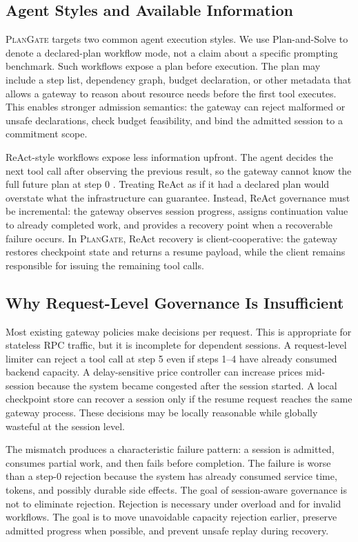 \documentclass[5p,times]{elsarticle}
\newcommand{\plangate}{\textsc{PlanGate}\xspace}
\begin{document}
\subsection{Agent Styles and Available Information}

\plangate targets two common agent execution styles. We use Plan-and-Solve to denote a declared-plan workflow mode, not a claim about a specific prompting benchmark. Such workflows expose a plan before execution. The plan may include a step list, dependency graph, budget declaration, or other metadata that allows a gateway to reason about resource needs before the first tool executes. This enables stronger admission semantics: the gateway can reject malformed or unsafe declarations, check budget feasibility, and bind the admitted session to a commitment scope.

ReAct-style workflows expose less information upfront. The agent decides the next tool call after observing the previous result, so the gateway cannot know the full future plan at step 0 \citep{yao2023react}. Treating ReAct as if it had a declared plan would overstate what the infrastructure can guarantee. Instead, ReAct governance must be incremental: the gateway observes session progress, assigns continuation value to already completed work, and provides a recovery point when a recoverable failure occurs. In \plangate, ReAct recovery is client-cooperative: the gateway restores checkpoint state and returns a resume payload, while the client remains responsible for issuing the remaining tool calls.

\subsection{Why Request-Level Governance Is Insufficient}

Most existing gateway policies make decisions per request. This is appropriate for stateless RPC traffic, but it is incomplete for dependent sessions. A request-level limiter can reject a tool call at step 5 even if steps 1--4 have already consumed backend capacity. A delay-sensitive price controller can increase prices mid-session because the system became congested after the session started. A local checkpoint store can recover a session only if the resume request reaches the same gateway process. These decisions may be locally reasonable while globally wasteful at the session level.

The mismatch produces a characteristic failure pattern: a session is admitted, consumes partial work, and then fails before completion. The failure is worse than a step-0 rejection because the system has already consumed service time, tokens, and possibly durable side effects. The goal of session-aware governance is not to eliminate rejection. Rejection is necessary under overload and for invalid workflows. The goal is to move unavoidable capacity rejection earlier, preserve admitted progress when possible, and prevent unsafe replay during recovery.
\end{document}
